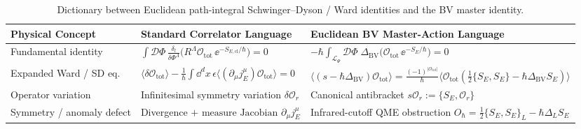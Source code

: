 \begin{table}[H]
\centering
\scriptsize
\setlength{\tabcolsep}{5pt}
\renewcommand{\arraystretch}{1.20}
\begin{tabularx}{\textwidth}{@{}l>{\raggedright\arraybackslash}X>{\raggedright\arraybackslash}X@{}}
\toprule
\textbf{Physical Concept} & \textbf{Standard Correlator Language} & \textbf{Euclidean BV Master-Action Language} \\
\midrule
Fundamental identity & $\int\mathcal{D}\Phi\,\frac{\delta_l}{\delta\Phi^\Lambda}\bigl(R^\Lambda\mathcal{O}_{\mathrm{tot}}\,\ee^{-S_{E,\mathrm{cl}}/\hbar}\bigr) = 0$ & $-\hbar\int_{\mathcal{L}_\Psi}\mathcal{D}\Phi\;\Delta_{\mathrm{BV}}\bigl(\mathcal{O}_{\mathrm{tot}}\,\ee^{-S_E/\hbar}\bigr) = 0$ \\
Expanded Ward / SD eq. & $\langle\delta\mathcal{O}_{\mathrm{tot}}\rangle - \frac{1}{\hbar}\int\dd^dx\,\epsilon\langle(\partial_\mu j^\mu_E)\mathcal{O}_{\mathrm{tot}}\rangle = 0$ & $\langle(s-\hbar\Delta_{\mathrm{BV}})\mathcal{O}_{\mathrm{tot}}\rangle = \frac{(-1)^{|\mathcal{O}_{\mathrm{tot}}|}}{\hbar}\langle\mathcal{O}_{\mathrm{tot}}(\frac{1}{2}\{S_E,S_E\}-\hbar\Delta_{\mathrm{BV}}S_E)\rangle$ \\
Operator variation & Infinitesimal symmetry variation $\delta\mathcal{O}_r$ & Canonical antibracket $s\mathcal{O}_r := \{S_E, \mathcal{O}_r\}$ \\
Symmetry / anomaly defect & Divergence $+\text{ measure Jacobian }\partial_\mu j^\mu_E$ & Infrared-cutoff QME obstruction $O_\hbar = \frac{1}{2}\{S_E,S_E\}_L - \hbar\Delta_L S_E$ \\
\bottomrule
\end{tabularx}
\caption{Dictionary between Euclidean path-integral Schwinger--Dyson / Ward identities and the BV master identity.}
\label{tab:correlator-vs-bv}
\end{table}

